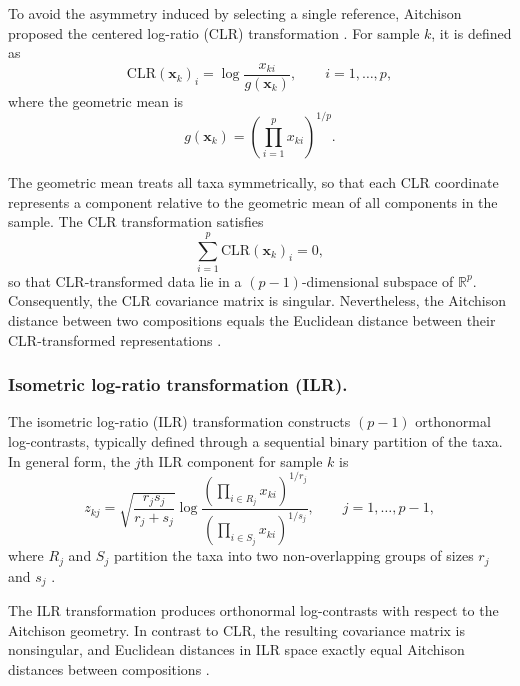 To avoid the asymmetry induced by selecting a single reference, Aitchison proposed the centered log-ratio (CLR) transformation \citep{aitchison1986statistical}. 
For sample $k$, it is defined as
\begin{equation}
\label{eq:2micro:CLR}
\text{CLR}(\mathbf{x}_k)_i = \log \frac{x_{ki}}{g(\mathbf{x}_k)},
\qquad i = 1,\dots,p,
\end{equation}
where the geometric mean is
\begin{equation}
\label{eq:2micro:geometric_mean}
g(\mathbf{x}_k) = \left( \prod_{i=1}^{p} x_{ki} \right)^{1/p}.
\end{equation}

The geometric mean treats all taxa symmetrically, so that each CLR coordinate represents a component relative to the geometric mean of all components in the sample.
The CLR transformation satisfies
\begin{equation}
\sum_{i=1}^{p} \text{CLR}(\mathbf{x}_k)_i = 0,
\end{equation}
so that CLR-transformed data lie in a $(p-1)$-dimensional subspace of $\mathbb{R}^{p}$. 
Consequently, the CLR covariance matrix is singular. 
Nevertheless, the Aitchison distance between two compositions equals the Euclidean distance between their CLR-transformed representations \citep{aitchison1986statistical}. 

\subsubsection*{Isometric log-ratio transformation (ILR).}

The isometric log-ratio (ILR) transformation \citep{egozcue2003isometric} constructs $(p-1)$ orthonormal log-contrasts, typically defined through a sequential binary partition of the taxa. 
In general form, the $j$th ILR component for sample $k$ is
\begin{equation}
z_{kj} = \sqrt{\frac{r_j s_j}{r_j + s_j}}
\log\frac{\left( \prod_{i \in R_j} x_{ki} \right)^{1/r_j}}{
\left( \prod_{i \in S_j} x_{ki} \right)^{1/s_j}},
\qquad j = 1,\dots,p-1,
\end{equation}
where $R_j$ and $S_j$ partition the taxa into two non-overlapping groups of sizes $r_j$ and $s_j$ \citep{greenacre2021compositional}. 

The ILR transformation produces orthonormal log-contrasts with respect to the Aitchison geometry. 
In contrast to CLR, the resulting covariance matrix is nonsingular, and Euclidean distances in ILR space exactly equal Aitchison distances between compositions \citep{egozcue2003isometric,greenacre2021compositional}. 

